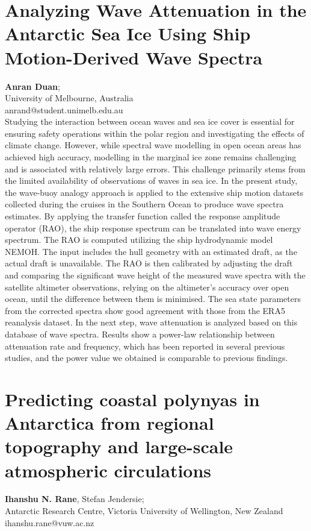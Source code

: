 \documentclass[9pt,a4paper,oneside]{book}
\numberwithin{equation}{section}
\begin{document}
\section*{Analyzing Wave Attenuation in the Antarctic Sea Ice Using Ship Motion-Derived Wave Spectra}
 \label{abs:7}
  {\bf Anran Duan};\\
University of Melbourne, Australia\\
anrand@student.unimelb.edu.au\\

Studying the interaction between ocean waves and sea ice cover is essential for ensuring safety operations within the polar region and investigating the effects of climate change. However, while spectral wave modelling in open ocean areas has achieved high accuracy, modelling in the marginal ice zone remains challenging and is associated with relatively large errors. This challenge primarily stems from the limited availability of observations of waves in sea ice. 
In the present study, the wave-buoy analogy approach is applied to the extensive ship motion datasets collected during the cruises in the Southern Ocean to produce wave spectra estimates. By applying the transfer function called the response amplitude operator (RAO), the ship response spectrum can be translated into wave energy spectrum. The RAO is computed utilizing the ship hydrodynamic model NEMOH. The input includes the hull geometry with an estimated draft, as the actual draft is unavailable. The RAO is then calibrated by adjusting the draft and comparing the significant wave height of the measured wave spectra with the satellite altimeter observations, relying on the altimeter’s accuracy over open ocean, until the difference between them is minimised. The sea state parameters from the corrected spectra show good agreement with those from the ERA5 reanalysis dataset. 
In the next step, wave attenuation is analyzed based on this database of wave spectra. Results show a power-law relationship between attenuation rate and frequency, which has been reported in several previous studies, and the power value we obtained is comparable to previous findings.


\section*{Predicting coastal polynyas in Antarctica from regional topography and large-scale atmospheric circulations
}
 \label{abs:8}
  {\bf Ihanshu N. Rane}, Stefan Jendersie;\\
Antarctic Research Centre, Victoria University of Wellington, New Zealand\\
ihanshu.rane@vuw.ac.nz\\
\end{document}
